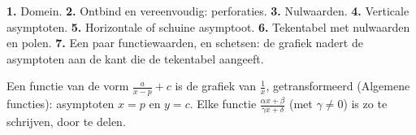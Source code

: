 \begin{werkwijze}
\textbf{1.} Domein. \textbf{2.} Ontbind en vereenvoudig: perforaties. \textbf{3.} Nulwaarden. \textbf{4.} Verticale asymptoten. \textbf{5.} Horizontale of schuine asymptoot. \textbf{6.} Tekentabel met nulwaarden en polen. \textbf{7.} Een paar functiewaarden, en schetsen: de grafiek nadert de asymptoten aan de kant die de tekentabel aangeeft.
\end{werkwijze}

Een functie van de vorm $\frac{a}{x - p} + c$ is de grafiek van $\frac1x$, getransformeerd (Algemene functies): asymptoten $x = p$ en $y = c$. Elke functie $\frac{\alpha x + \beta}{\gamma x + \delta}$ (met $\gamma \neq 0$) is zo te schrijven, door te delen.

\begin{oefeningen}


\end{oefeningen}

\opdrachtenkop

\begin{oefeningen}

























\end{oefeningen}

